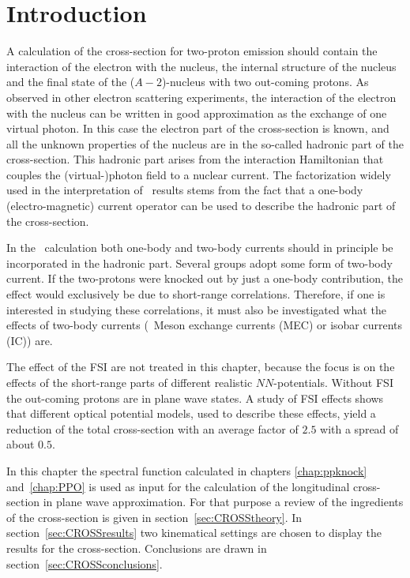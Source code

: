\section{Introduction}
A calculation of the cross-section for two-proton emission should contain
the interaction of the electron with the nucleus, the internal structure of the
nucleus and the final state of the ($A-2$)-nucleus with two out-coming protons.
As observed in other electron scattering experiments, the interaction of the 
electron with the nucleus can be written in good approximation as the exchange
of one virtual photon. In this case the electron part of the cross-section is
known, and all the unknown properties of the nucleus are in the so-called 
hadronic part of the cross-section. This hadronic part arises from the 
interaction Hamiltonian that couples the (virtual-)photon
field to a nuclear current. The factorization widely used in the interpretation
 of
\eep\ results stems from the fact that a one-body (electro-magnetic) current 
operator can be used to describe the hadronic part of the cross-section.

In the \eepp\ calculation both one-body and two-body currents should in 
principle be 
incorporated in the hadronic part. Several groups \cite{Ry94,GP91,GP92,GP94}
adopt some form of two-body current. If the two-protons were knocked out by just
a one-body contribution, the effect would exclusively be due to short-range 
correlations. 
Therefore, if one is interested in studying these correlations, it must also  
be investigated what the effects of two-body
currents (\eg\ Meson exchange currents (MEC) or isobar currents (IC)) are.

The effect of the FSI are not treated in this chapter, because the focus is
on the effects of the short-range parts of  different realistic $NN$-potentials.
Without FSI the out-coming protons are in plane wave states. A  
study\cite{GP91} of 
FSI effects shows that different optical potential models, used to 
describe 
these effects, yield a reduction of the total cross-section with an average 
factor of $2.5$ with a spread of about $0.5$.

In this chapter the spectral function calculated in chapters \ref{chap:ppknock} 
and~\ref{chap:PPO} is used as input for the calculation of the longitudinal 
cross-section in plane wave approximation. For that purpose a review of the
ingredients of the cross-section is given in section~\ref{sec:CROSStheory}.
In section~\ref{sec:CROSSresults} two kinematical settings are chosen to display
the results for the cross-section. Conclusions are drawn in 
section~\ref{sec:CROSSconclusions}.
